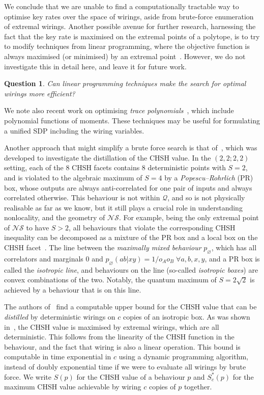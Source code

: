 \documentclass[10pt, a4paper]{article}
\numberwithin{equation}{section} %
\theoremstyle{definition}
\theoremstyle{plain}
\newtheorem{question}{Question}
\newcommand{\?}{\mathrel{?}} %
\newcommand{\Qs}{\mathcal{Q}}
\newcommand{\NSs}{\mathcal{NS}}
\begin{document}
                  We conclude that we are unable to find a computationally tractable way to optimise key rates over the space of wirings, aside from brute-force enumeration of extremal wirings. Another possible avenue for further research, harnessing the fact that the key rate is maximised on the extremal points of a polytope, is to try to modify techniques from linear programming, where the objective function is always maximised (or minimised) by an extremal point~\cite{LuenbergerYe}. However, we do not investigate this in detail here, and leave it for future work.
                  \begin{question}
                    Can linear programming techniques make the search for optimal wirings more efficient?
                  \end{question}
                  We note also recent work on optimising \emph{trace polynomials}~\cite{TracePolyOpt}, which include polynomial functions of moments. These techniques may be useful for formulating a unified SDP including the wiring variables.

                    Another approach that might simplify a brute force search is that of~\cite{DistillationBounds}, which was developed to investigate the distillation of the CHSH value. In the \((2,2;2,2)\) setting, each of the 8 CHSH facets contains 8 deterministic points with \(S = 2\), and is violated to the algebraic maximum of \(S = 4\) by a \emph{Popescu–Rohrlich} (PR) box, whose outputs are always anti-correlated for one pair of inputs and always correlated otherwise. This behaviour is not within \(\Qs\), and so is not physically realisable as far as we know, but it still plays a crucial role in understanding nonlocality, and the geometry of \(\NSs\). For example, being the only extremal point of \(\NSs\) to have \(S > 2\), all behaviours that violate the corresponding CHSH inequality can be decomposed as a mixture of the PR box and a local box on the CHSH facet~\cite{GeomDecomp}. The line between the \emph{maximally mixed behaviour} \(p_{\varnothing}\), which has all correlators and marginals 0 and \(p_{\varnothing}(ab|xy) = 1/o_A o_B\; \forall a,b,x,y\), and a PR box is called the \emph{isotropic line}, and behaviours on the line (so-called \emph{isotropic boxes}) are convex combinations of the two. Notably, the quantum maximum of \(S = 2\sqrt{2}\) is achieved by a behaviour that is on this line.

                    The authors of~\cite{DistillationBounds} find a computable upper bound for the CHSH value that can be \emph{distilled} by deterministic wirings on \(c\) copies of an isotropic box. As was shown in~\cite{JanLiThesis}, the CHSH value is maximised by extremal wirings, which are all deterministic. This follows from the linearity of the CHSH function in the behaviour, and the fact that wiring is also a linear operation. This bound is computable in time exponential in \(c\) using a dynamic programming algorithm, instead of doubly exponential time if we were to evaluate all wirings by brute force. We write \(S(p)\) for the CHSH value of a behaviour \(p\) and \(S^*_c(p)\) for the maximum CHSH value achievable by wiring \(c\) copies of \(p\) together.
\end{document}
